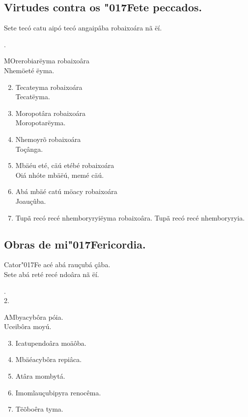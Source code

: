 \documentclass[openany,titlepage,12pt]{book}
\newcommand{\lgS}{\char"017F}
\newcommand{\comecalista}[5]{
    \hspace*{-11.7pt}
    \begin{minipage}[t]{0.08\linewidth}
        \flushright #1\\#2
    \end{minipage}
    \hspace{0pt}
    \begin{minipage}[t]{0.94\linewidth}
        \lettrine
        [findent =2pt, nindent=0pt,  lines=2]
        {#3}{#4}#5
    \end{minipage}
    \vspace*{-3pt}
}
\begin{document}
\subsection{Virtudes contra os \lgS ete peccados.}
\begin{center}
    Sete tecó catu aipó tecó angaipâba robaixoára nã ëí.  
\end{center}
\comecalista{1.}{}{M}{O}
    {rerobiarëyma robaixoâra\\\hspace*{10pt} Nhemöeté ëyma.}
\begin{enumerate}
    \setcounter{enumi}{1}
    \item Tecateyma robaixoára\\\hspace*{40pt} Tecatëyma.
    \item Moropotâra robaixoára\\\hspace*{40pt} Moropotarëyma.
    \item Nhemoyrõ robaixoára\\\hspace*{40pt} Toçânga.
    \item Mbäéu eté, cäú etébé robaixoára\\
    \hspace*{40pt} Oiá nhóte mbäëú, memé cäú.
    \item Abá mbäé catú möacy robaixoára\\\hspace*{40pt}
    Joauçûba.
    \item Tupã recó recé nhemboryryiëyma robaixoâra. Tupã
    recó recé nhemboryryia.
\end{enumerate}

\subsection{Obras de mi\lgS ericordia.}
\begin{center}
    Cator\lgS e acé abá rauçubá çâba.\\
    Sete abá reté recé ndoâra nã ëí.
\end{center}
\comecalista{1.}{2.}{A}{M}
    {byacybôra póia.\\Uceibôra moyú.}
\begin{enumerate}
    \setcounter{enumi}{2}
    \item Icatupendoâra moäôba.
    \item Mbäéacybôra repiâca.
    \item Atâra mombytá.
    \item Imomĩauçubipyra renocêma.
    \item Tëõboêra tyma.
\end{enumerate}
\end{document}
